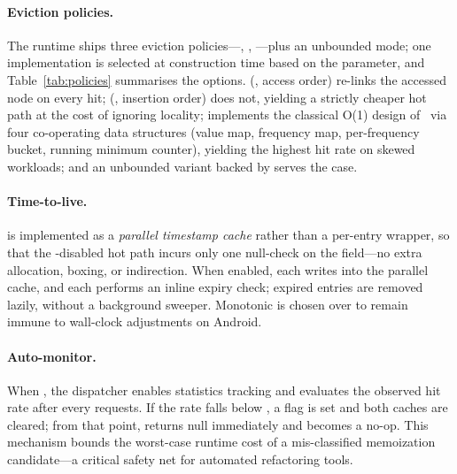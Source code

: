 \paragraph{Eviction policies.} The runtime ships three eviction policies---\lru, \fifo, \lfu---plus an unbounded mode; one  implementation is selected at construction time based on the  parameter, and Table~\ref{tab:policies} summarises the options. \lru (, access order) re-links the accessed node on every hit; \fifo (, insertion order) does not, yielding a strictly cheaper hot path at the cost of ignoring locality; \lfu implements the classical O(1) design of~\cite{pin2010lfu} via four co-operating data structures (value map, frequency map, per-frequency bucket, running minimum counter), yielding the highest hit rate on skewed workloads; and an unbounded variant backed by  serves the  case.



\paragraph{Time-to-live.} \ttl is implemented as a \emph{parallel timestamp cache} rather than a per-entry wrapper, so that the \ttl-disabled hot path incurs only one null-check on the  field---no extra allocation, boxing, or indirection. When enabled, each  writes  into the parallel cache, and each  performs an inline expiry check; expired entries are removed lazily, without a background sweeper. Monotonic  is chosen over  to remain immune to wall-clock adjustments on Android.

\paragraph{Auto-monitor.} When , the dispatcher enables statistics tracking and evaluates the observed hit rate after every  requests. If the rate falls below , a   flag is set and both caches are cleared; from that point,  returns null immediately and  becomes a no-op. This mechanism bounds the worst-case runtime cost of a mis-classified memoization candidate---a critical safety net for automated refactoring tools.

